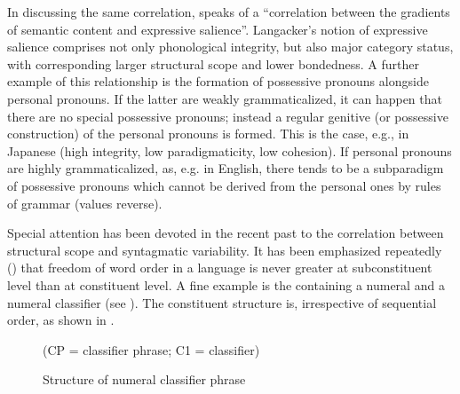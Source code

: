 In discussing the same correlation, \citet[112f]{Langacker1977} speaks of a “correlation between the gradients of semantic content and expressive salience”. Langacker's notion of expressive salience comprises not only phonological integrity, but also major category status, with corresponding larger structural scope and lower bondedness. A further example of this relationship is the formation of possessive pronouns alongside personal pronouns. If the latter are weakly grammaticalized, it can happen that there are no special possessive pronouns; instead a regular genitive (or possessive construction) of the personal pronouns is formed. This is the case, e.g., in Japanese (high integrity, low paradigmaticity, low cohesion). If personal pronouns are highly grammaticalized, as, e.g. in English, there tends to be a subparadigm of possessive pronouns which cannot be derived from the personal ones by rules of grammar (values reverse).

\enlargethispage{1\baselineskip}
Special attention has been devoted in the recent past to the correlation between structural scope and syntagmatic variability. It has been emphasized repeatedly (\citealt[205--209]{Givón1979a}) that freedom of word order in a language is never greater at subconstituent level than at constituent level. A fine example is the \np containing a numeral and a numeral classifier (see \citealt[29]{Greenberg1975}). The constituent structure is, irrespective of sequential order, as shown in .

\begin{figure}
	
	(CP = classifier phrase; C1 = classifier)
	\caption{Structure of numeral classifier phrase} \label{F11}
\end{figure}

